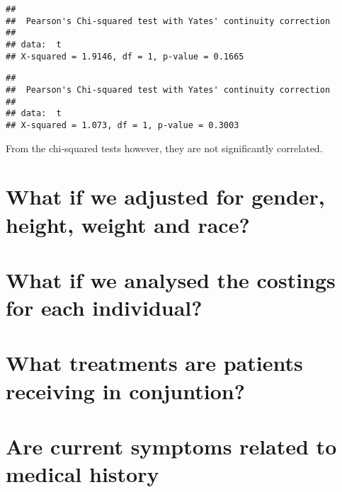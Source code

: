 \documentclass[
]{article}
\newenvironment{Shaded}{\begin{snugshade}}{\end{snugshade}}
\newcommand{\FunctionTok}[1]{\textcolor[rgb]{0.13,0.29,0.53}{\textbf{#1}}}
\newcommand{\NormalTok}[1]{#1}
\newcommand{\OtherTok}[1]{\textcolor[rgb]{0.56,0.35,0.01}{#1}}
\newcommand{\SpecialCharTok}[1]{\textcolor[rgb]{0.81,0.36,0.00}{\textbf{#1}}}
\begin{document}
\begin{verbatim}
## 
##  Pearson's Chi-squared test with Yates' continuity correction
## 
## data:  t
## X-squared = 1.9146, df = 1, p-value = 0.1665
\end{verbatim}

\begin{Shaded}
\end{Shaded}

\begin{verbatim}
## 
##  Pearson's Chi-squared test with Yates' continuity correction
## 
## data:  t
## X-squared = 1.073, df = 1, p-value = 0.3003
\end{verbatim}

From the chi-squared tests however, they are not significantly
correlated.

\hypertarget{what-if-we-adjusted-for-gender-height-weight-and-race}{%
\section{What if we adjusted for gender, height, weight and
race?}\label{what-if-we-adjusted-for-gender-height-weight-and-race}}

\hypertarget{what-if-we-analysed-the-costings-for-each-individual}{%
\section{What if we analysed the costings for each
individual?}\label{what-if-we-analysed-the-costings-for-each-individual}}

\hypertarget{what-treatments-are-patients-receiving-in-conjuntion}{%
\section{What treatments are patients receiving in
conjuntion?}\label{what-treatments-are-patients-receiving-in-conjuntion}}

\hypertarget{are-current-symptoms-related-to-medical-history}{%
\section{Are current symptoms related to medical
history}\label{are-current-symptoms-related-to-medical-history}}
\end{document}
